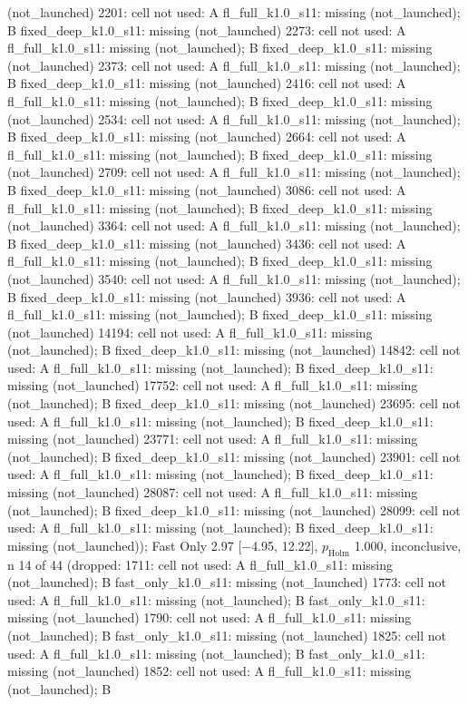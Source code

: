 \begin{table}[t]
{(not\_launched) \textbar{} 2201: cell not used: A fl\_full\_k1.0\_s11: missing (not\_launched); B fixed\_deep\_k1.0\_s11: missing (not\_launched) \textbar{} 2273: cell not used: A fl\_full\_k1.0\_s11: missing (not\_launched); B fixed\_deep\_k1.0\_s11: missing (not\_launched) \textbar{} 2373: cell not used: A fl\_full\_k1.0\_s11: missing (not\_launched); B fixed\_deep\_k1.0\_s11: missing (not\_launched) \textbar{} 2416: cell not used: A fl\_full\_k1.0\_s11: missing (not\_launched); B fixed\_deep\_k1.0\_s11: missing (not\_launched) \textbar{} 2534: cell not used: A fl\_full\_k1.0\_s11: missing (not\_launched); B fixed\_deep\_k1.0\_s11: missing (not\_launched) \textbar{} 2664: cell not used: A fl\_full\_k1.0\_s11: missing (not\_launched); B fixed\_deep\_k1.0\_s11: missing (not\_launched) \textbar{} 2709: cell not used: A fl\_full\_k1.0\_s11: missing (not\_launched); B fixed\_deep\_k1.0\_s11: missing (not\_launched) \textbar{} 3086: cell not used: A fl\_full\_k1.0\_s11: missing (not\_launched); B fixed\_deep\_k1.0\_s11: missing (not\_launched) \textbar{} 3364: cell not used: A fl\_full\_k1.0\_s11: missing (not\_launched); B fixed\_deep\_k1.0\_s11: missing (not\_launched) \textbar{} 3436: cell not used: A fl\_full\_k1.0\_s11: missing (not\_launched); B fixed\_deep\_k1.0\_s11: missing (not\_launched) \textbar{} 3540: cell not used: A fl\_full\_k1.0\_s11: missing (not\_launched); B fixed\_deep\_k1.0\_s11: missing (not\_launched) \textbar{} 3936: cell not used: A fl\_full\_k1.0\_s11: missing (not\_launched); B fixed\_deep\_k1.0\_s11: missing (not\_launched) \textbar{} 14194: cell not used: A fl\_full\_k1.0\_s11: missing (not\_launched); B fixed\_deep\_k1.0\_s11: missing (not\_launched) \textbar{} 14842: cell not used: A fl\_full\_k1.0\_s11: missing (not\_launched); B fixed\_deep\_k1.0\_s11: missing (not\_launched) \textbar{} 17752: cell not used: A fl\_full\_k1.0\_s11: missing (not\_launched); B fixed\_deep\_k1.0\_s11: missing (not\_launched) \textbar{} 23695: cell not used: A fl\_full\_k1.0\_s11: missing (not\_launched); B fixed\_deep\_k1.0\_s11: missing (not\_launched) \textbar{} 23771: cell not used: A fl\_full\_k1.0\_s11: missing (not\_launched); B fixed\_deep\_k1.0\_s11: missing (not\_launched) \textbar{} 23901: cell not used: A fl\_full\_k1.0\_s11: missing (not\_launched); B fixed\_deep\_k1.0\_s11: missing (not\_launched) \textbar{} 28087: cell not used: A fl\_full\_k1.0\_s11: missing (not\_launched); B fixed\_deep\_k1.0\_s11: missing (not\_launched) \textbar{} 28099: cell not used: A fl\_full\_k1.0\_s11: missing (not\_launched); B fixed\_deep\_k1.0\_s11: missing (not\_launched)); Fast Only 2.97 [$-$4.95, 12.22], $p_\mathrm{Holm}$ 1.000, inconclusive, n 14 of 44 (dropped: 1711: cell not used: A fl\_full\_k1.0\_s11: missing (not\_launched); B fast\_only\_k1.0\_s11: missing (not\_launched) \textbar{} 1773: cell not used: A fl\_full\_k1.0\_s11: missing (not\_launched); B fast\_only\_k1.0\_s11: missing (not\_launched) \textbar{} 1790: cell not used: A fl\_full\_k1.0\_s11: missing (not\_launched); B fast\_only\_k1.0\_s11: missing (not\_launched) \textbar{} 1825: cell not used: A fl\_full\_k1.0\_s11: missing (not\_launched); B fast\_only\_k1.0\_s11: missing (not\_launched) \textbar{} 1852: cell not used: A fl\_full\_k1.0\_s11: missing (not\_launched); B }
\end{table}
